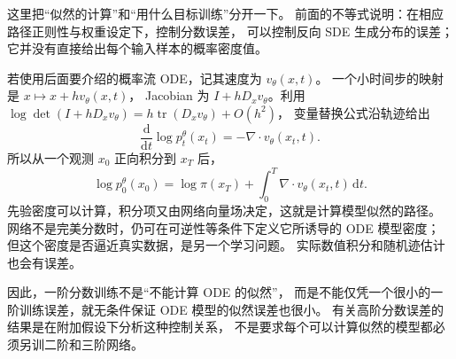 这里把“似然的计算”和“用什么目标训练”分开一下。
前面的不等式说明：在相应路径正则性与权重设定下，控制分数误差，
可以控制反向 SDE 生成分布的误差；它并没有直接给出每个输入样本的概率密度值。

若使用后面要介绍的概率流 ODE，记其速度为 $v_\theta(x,t)$。
一个小时间步的映射是 $x\mapsto x+h v_\theta(x,t)$，
Jacobian 为 $I+hD_xv_\theta$。利用
$\log\det(I+hD_xv_\theta)=h\operatorname{tr}(D_xv_\theta)+O(h^2)$，
变量替换公式沿轨迹给出
\[
\frac{\mathrm d}{\mathrm dt}\log p_t^\theta(x_t)
=-\nabla\cdot v_\theta(x_t,t).
\]
所以从一个观测 $x_0$ 正向积分到 $x_T$ 后，
\[
\log p_0^\theta(x_0)=\log\pi(x_T)
 +\int_0^T\nabla\cdot v_\theta(x_t,t)\,\mathrm dt.
\]
先验密度可以计算，积分项又由网络向量场决定，这就是计算模型似然的路径。
网络不是完美分数时，仍可在可逆性等条件下定义它所诱导的 ODE 模型密度；
但这个密度是否逼近真实数据，是另一个学习问题。
实际数值积分和随机迹估计也会有误差。

因此，一阶分数训练不是“不能计算 ODE 的似然”，
而是不能仅凭一个很小的一阶训练误差，就无条件保证 ODE 模型的似然误差也很小。
有关高阶分数误差的结果是在附加假设下分析这种控制关系，
不是要求每个可以计算似然的模型都必须另训二阶和三阶网络。\cite{sde,theorybook}
